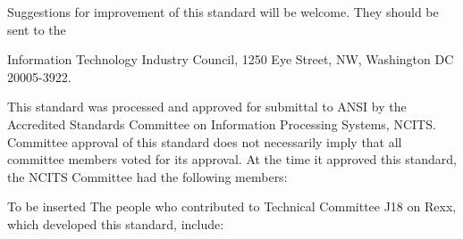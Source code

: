 Suggestions for improvement of this standard will be welcome. They
should be sent to the

Information Technology Industry Council, 1250 Eye Street, NW, Washington
DC 20005-3922.

This standard was processed and approved for submittal to ANSI by the
Accredited Standards Committee on Information Processing Systems, NCITS.
Committee approval of this standard does not necessarily imply that all
committee members voted for its approval. At the time it approved this
standard, the NCITS Committee had the following members:

To be inserted The people who contributed to Technical Committee J18 on
Rexx, which developed this standard, include:
